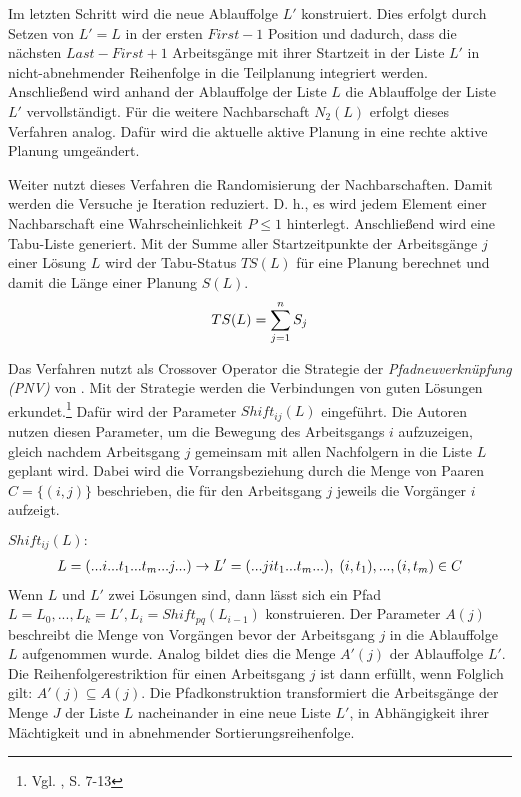 \documentclass[a4paper,12pt,normalheadings,footexclude,headinclude,liststotoc,nochapterprefix,onecolumn,oneside,parskip,pointlessnumbers]{scrreprt}
\begin{document}
Im letzten Schritt wird die neue Ablauffolge $L'$ konstruiert. Dies erfolgt durch Setzen von $L'=L$ in der ersten $First-1$ Position und dadurch, dass die nächsten $Last-First+1$ Arbeitsgänge mit ihrer Startzeit in der Liste $L'$ in nicht-abnehmender Reihenfolge in die Teilplanung integriert werden. Anschließend wird anhand der Ablauffolge der Liste $L$ die Ablauffolge der Liste $L'$ vervollständigt. Für die weitere Nachbarschaft $N_{2}(L)$ erfolgt dieses Verfahren analog. Dafür wird die aktuelle aktive Planung in eine rechte aktive Planung umgeändert.

Weiter nutzt dieses Verfahren die Randomisierung der Nachbarschaften. Damit werden die Versuche je Iteration reduziert. D. h., es wird jedem Element einer Nachbarschaft eine Wahrscheinlichkeit $P\leq1$ hinterlegt. Anschließend wird eine Tabu-Liste generiert. Mit der Summe aller Startzeitpunkte der Arbeitsgänge $j$ einer Lösung $L$ wird der Tabu-Status $TS(L)$ für eine Planung berechnet und damit die Länge einer Planung $S(L)$.
\begin{eqnarray} 
TS(L)=\sum^{n}_{j=1}S_{j}
\hfill
\end{eqnarray}

Das Verfahren nutzt als Crossover Operator die Strategie der \textit{Pfadneuverknüpfung (PNV)} von \cite{glover1999tabu}. Mit der Strategie werden die Verbindungen von guten Lösungen erkundet.\footnote{Vgl. \cite{glover2000fundamentals}, S. 7-13} Dafür wird der Parameter $Shift_{ij}(L)$ eingeführt. Die Autoren nutzen diesen Parameter, um die Bewegung des Arbeitsgangs $i$ aufzuzeigen, gleich nachdem Arbeitsgang $j$ gemeinsam mit allen Nachfolgern in die Liste $L$ geplant wird. Dabei wird die Vorrangsbeziehung durch die Menge von Paaren $C=\{(i,j)\}$ beschrieben, die für den Arbeitsgang $j$ jeweils die Vorgänger $i$ aufzeigt.

$Shift_{ij}(L):$
\begin{eqnarray} 
L=(...i...t_{1}...t_{m}...j...)\rightarrow L'=(...jit_{1}...t_{m}...), \;
\hfill (i,t_{1}),...,(i,t_{m})\in C
\end{eqnarray}%
Wenn $L$ und $L'$ zwei Lösungen sind, dann lässt sich ein Pfad $L=L_{0},...,L_{k}=L', L_{i}=Shift_{pq}(L_{i-1})$ konstruieren. Der Parameter $A(j)$ beschreibt die Menge von Vorgängen bevor der Arbeitsgang $j$ in die Ablauffolge $L$ aufgenommen wurde. Analog bildet dies die Menge $A'(j)$ der Ablauffolge $L'$. Die Reihenfolgerestriktion für einen Arbeitsgang $j$ ist dann erfüllt, wenn Folglich gilt: $A'(j)\subseteq A(j)$. Die Pfadkonstruktion transformiert die Arbeitsgänge der Menge $J$ der Liste $L$ nacheinander in eine neue Liste $L'$, in Abhängigkeit ihrer Mächtigkeit und in abnehmender Sortierungsreihenfolge.
\end{document}
